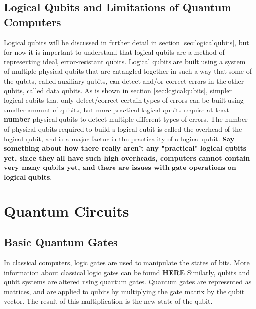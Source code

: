 \documentclass{article}
\begin{document}
\subsection{Logical Qubits and Limitations of Quantum Computers}
\label{sec:logicalqubitsbrief}
Logical qubits will be discussed in further detail in section \ref{sec:logicalqubits}, but for now it is important to understand that logical qubits are a method of representing
ideal, error-resistant qubits. Logical qubits are built using a system of multiple physical qubits that are entangled together in such a way that some of the qubits, called 
auxiliary qubits, can detect and/or correct errors in the other qubits, called data qubits. As is shown in section \ref{sec:logicalqubits}, simpler logical qubits that only 
detect/correct certain types of errors can be built using smaller amount of qubits, but more practical logical qubits require at least \textbf{number} physical qubits to detect
multiple different types of errors. The number of physical qubits required to build a logical qubit is called the overhead of the logical qubit, and is a major factor in the
practicality of a logical qubit. \textbf{Say something about how there really aren't any "practical" logical qubits yet, since they all have such high overheads, computers 
cannot contain very many qubits yet, and there are issues with gate operations on logical qubits}.













\section{Quantum Circuits}
\label{sec:quantumcircuits}



\subsection{Basic Quantum Gates}
\label{sec:basicgates}
In classical computers, logic gates are used to manipulate the states of bits. More information about classical logic gates can be found \textbf{HERE} 
Similarly, qubits and qubit systems are altered 
using quantum gates. Quantum gates are represented as matrices, and are applied to qubits by multiplying the gate matrix by 
the qubit vector. The result of this multiplication is the new state of the qubit.
\end{document}
